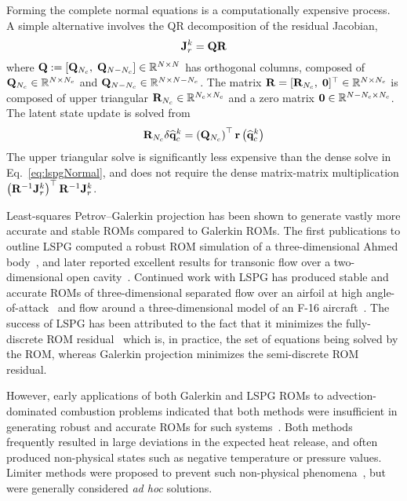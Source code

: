 Forming the complete normal equations is a computationally expensive process. A simple alternative involves the QR decomposition of the residual Jacobian, 
%
\begin{equation}
    \mathbf{J}_{r}^{k} = \mathbf{QR}
\end{equation}
%
where $\mathbf{Q} := \left[\mathbf{Q}_{N_c}, \; \mathbf{Q}_{N-N_c}\right] \in \mathbb{R}^{N \times N}$ has orthogonal columns, composed of $\mathbf{Q}_{N_c} \in \mathbb{R}^{N \times N_c}$ and $\mathbf{Q}_{N - N_c} \in \mathbb{R}^{N \times N - N_c}$. The matrix $\mathbf{R} = [\mathbf{R}_{N_c}, \; \mathbf{0}]^\top \in \mathbb{R}^{N \times N_c}$ is composed of upper triangular $\mathbf{R}_{N_c} \in \mathbb{R}^{N_c \times N_c}$ and a zero matrix $\mathbf{0} \in \mathbb{R}^{N - N_c \times N_c}$. The latent state update is solved from
%
\begin{equation}
    \mathbf{R}_{N_c} \delta \mathbf{\widehat{q}}_{c}^{k} = \left(\mathbf{Q}_{N_c}\right)^\top \mathbf{r}\left(\mathbf{\widehat{q}}_{c}^{k}\right)
\end{equation}
%
The upper triangular solve is significantly less expensive than the dense solve in Eq.~\ref{eq:lspgNormal}, and does not require the dense matrix-matrix multiplication $\left(\resScaleInv \jacobRes^{\newtonIdx}\right)^\top \resScaleInv \jacobRes^{\newtonIdx}$.

Least-squares Petrov--Galerkin projection has been shown to generate vastly more accurate and stable ROMs compared to Galerkin ROMs. The first publications to outline LSPG computed a robust ROM simulation of a three-dimensional Ahmed body~\cite{Carlberg2010,Carlberg2013}, and later reported excellent results for transonic flow over a two-dimensional open cavity~\cite{Carlberg2017}. Continued work with LSPG has produced stable and accurate ROMs of three-dimensional separated flow over an airfoil at high angle-of-attack~\cite{Grimberg2020Hyper} and flow around a three-dimensional model of an F-16 aircraft~\cite{Grimberg2021}. The success of LSPG has been attributed to the fact that it minimizes the fully-discrete ROM residual~\cite{Grimberg2020} which is, in practice, the set of equations being solved by the ROM, whereas Galerkin projection minimizes the semi-discrete ROM residual.

However, early applications of both Galerkin and LSPG ROMs to advection-dominated combustion problems indicated that both methods were insufficient in generating robust and accurate ROMs for such systems~\cite{Huang2018b,Huang2019}. Both methods frequently resulted in large deviations in the expected heat release, and often produced non-physical states such as negative temperature or pressure values. Limiter methods were proposed to prevent such non-physical phenomena~\cite{Huang2019,Huang2020}, but were generally considered \textit{ad hoc} solutions. 